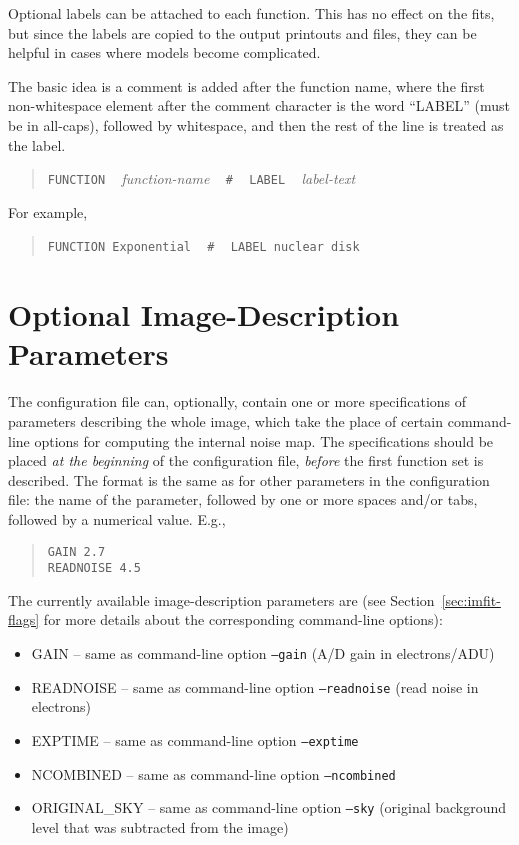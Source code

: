 \documentclass[10pt,a4paper,article]{memoir}
\begin{document}
Optional labels can be attached to each function. This has no effect on the fits,
but since the labels are copied to the output printouts and files, they can be
helpful in cases where models become complicated.

The basic idea is a comment is added after the function name, where the first
non-whitespace element after the comment character is the word ``LABEL'' (must
be in all-caps), followed by whitespace, and then the rest of the line is
treated as the label.

\begin{quote}
\texttt{FUNCTION} ~ \textit{function-name} ~ \texttt{\#} ~ \texttt{LABEL} ~ \textit{label-text}
\end{quote}

For example,

\begin{quote}
\texttt{FUNCTION Exponential} ~ \texttt{\#} ~ \texttt{LABEL nuclear disk}
\end{quote}


\section{Optional Image-Description Parameters}

The configuration file can, optionally, contain one or more specifications of 
parameters describing the whole image, which take the place of certain command-line
options for computing the internal noise map.  The specifications should be placed
\textit{at the beginning} of the configuration file, \textit{before} the first function
set is described. The format is the same as for other parameters in the configuration
file: the name of the parameter, followed by one or more spaces and/or tabs, followed
by a numerical value. E.g.,
\begin{quote}
  \texttt{GAIN  2.7} \\
  \texttt{READNOISE  4.5} \\
\end{quote}

The currently available image-description parameters are (see Section~\ref{sec:imfit-flags} for more
details about the corresponding command-line options):
\begin{itemize}
\item GAIN -- same as command-line option \texttt{--gain} (A/D gain in electrons/ADU)
\item READNOISE -- same as command-line option \texttt{--readnoise} (read noise in electrons)
\item EXPTIME -- same as command-line option \texttt{--exptime}
\item NCOMBINED -- same as command-line option \texttt{--ncombined}
\item ORIGINAL\_SKY -- same as command-line option \texttt{--sky} (original
background level that was subtracted from the image)
\end{itemize}
\end{document}
